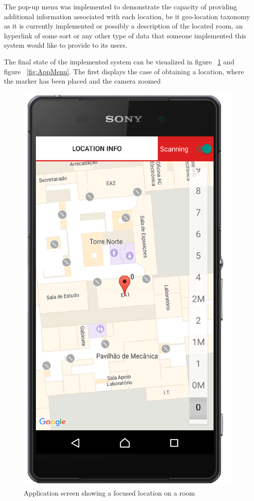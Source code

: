\documentclass[a4paper]{IEEEtran}
\begin{document}
The pop-up menu was implemented to demonstrate the capacity of providing additional information associated with each location, be it geo-location taxonomy as it is currently implemented or possibly a description of the located room, an hyperlink of some sort or any other type of data that someone implemented this system would like to provide to its users.  

The final state of the implemented system can be visualized in figure ~\ref{fig:AppFocus} and figure ~\ref{fig:AppMenu}. The first displays the case of obtaining a location, where the marker has been placed and the camera zoomed

\begin{figure}
	\centering
		\includegraphics[width=0.5\linewidth]{figures/app_focused.png}
	\caption[Application screen showing a focused location on a room]{Application screen showing a focused location on a room}
	\label{fig:AppFocus}
\end{figure}
\end{document}
